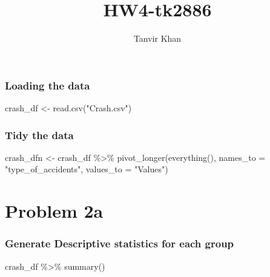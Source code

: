 \documentclass[
]{article}
\title{HW4-tk2886}
\author{Tanvir Khan}
\date{}
\newenvironment{Shaded}{\begin{snugshade}}{\end{snugshade}}
\newcommand{\AttributeTok}[1]{\textcolor[rgb]{0.77,0.63,0.00}{#1}}
\newcommand{\FunctionTok}[1]{\textcolor[rgb]{0.00,0.00,0.00}{#1}}
\newcommand{\NormalTok}[1]{#1}
\newcommand{\OtherTok}[1]{\textcolor[rgb]{0.56,0.35,0.01}{#1}}
\newcommand{\SpecialCharTok}[1]{\textcolor[rgb]{0.00,0.00,0.00}{#1}}
\newcommand{\StringTok}[1]{\textcolor[rgb]{0.31,0.60,0.02}{#1}}
\begin{document}
\maketitle

\hypertarget{loading-the-data}{%
\subsubsection{Loading the data}\label{loading-the-data}}

\begin{Shaded}
\begin{Highlighting}[]
\NormalTok{crash\_df }\OtherTok{\textless{}{-}} 
  \FunctionTok{read.csv}\NormalTok{(}\StringTok{"Crash.csv"}\NormalTok{)}
\end{Highlighting}
\end{Shaded}

\hypertarget{tidy-the-data}{%
\subsubsection{Tidy the data}\label{tidy-the-data}}

\begin{Shaded}
\begin{Highlighting}[]
\NormalTok{crash\_dfn }\OtherTok{\textless{}{-}}
\NormalTok{  crash\_df }\SpecialCharTok{\%\textgreater{}\%}
  \FunctionTok{pivot\_longer}\NormalTok{(}\FunctionTok{everything}\NormalTok{(), }
               \AttributeTok{names\_to =} \StringTok{"type\_of\_accidents"}\NormalTok{,}
               \AttributeTok{values\_to =} \StringTok{"Values"}\NormalTok{)}
\end{Highlighting}
\end{Shaded}

\hypertarget{problem-2a}{%
\section{Problem 2a}\label{problem-2a}}

\hypertarget{generate-descriptive-statistics-for-each-group}{%
\subsubsection{Generate Descriptive statistics for each
group}\label{generate-descriptive-statistics-for-each-group}}

\begin{Shaded}
\begin{Highlighting}[]
\NormalTok{crash\_df }\SpecialCharTok{\%\textgreater{}\%} \FunctionTok{summary}\NormalTok{()}
\end{Highlighting}
\end{Shaded}
\end{document}
